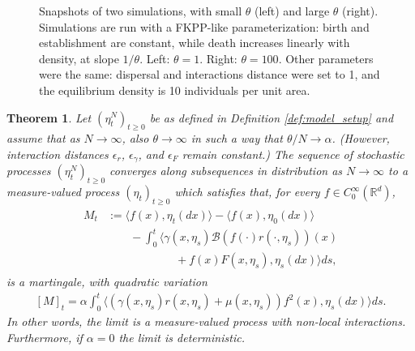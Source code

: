 \documentclass[12pt]{article}
\newtheorem{theorem}{Theorem}[section]
\newcommand{\IR}{\mathbb R}
\begin{document}
\begin{figure}
\begin{center}
    \end{center}
    \caption{
        Snapshots of two simulations, with small $\theta$ (left) and large $\theta$ (right).
        Simulations are run with a FKPP-like parameterization:
        birth and establishment are constant, while death increases linearly with density,
        at slope $1/\theta$.
        Left: $\theta=1$. Right: $\theta=100$.
        Other parameters were the same:
        dispersal and interactions distance were set to 1,
        and the equilibrium density is 10 individuals per unit area.
        \label{fig:super_vs_det_2d}
    }
\end{figure}

\begin{theorem} \label{thm:nonlocal_convergence}
    Let $(\eta^N_t)_{t \geq 0}$
    be as defined in Definition \ref{def:model_setup}
    and assume that as $N \to \infty$, also $\theta \to \infty$
    in such a way that $\theta/N \to \alpha$.
    (However, interaction distances $\epsilon_r$, $\epsilon_\gamma$, and $\epsilon_F$
    remain constant.)
    The sequence of stochastic processes
    $(\eta^N_t)_{t \geq 0}$
    converges along subsequences in distribution as $N \to \infty$
    to a measure-valued process $(\eta_t)_{t \geq 0}$
    which satisfies that, for every $f \in C^\infty_0(\IR^d)$,
    \begin{align} \label{eqn:limiting_mgale_problem}
        \begin{split}
        M_t
            &:=
            \langle f(x), \eta_t(dx) \rangle
            -
            \langle f(x), \eta_0(dx) \rangle
            \\ & \qquad
            -
            \int_0^t \big\langle
                \gamma(x, \eta_s)
                \mathcal{B}\left(
                    f(\cdot) r(\cdot, \eta_s)
                \right)(x)
                \\ &\qquad \qquad \qquad {}
                +
                f(x)
                F(x, \eta_s),
                \eta_{s}(dx)
            \big\rangle ds,
        \end{split}
    \end{align}
    is a martingale,
    with quadratic variation
    \begin{align} \label{eqn:limiting_mgale_variation}
        [ M ]_t
        =
        \alpha
        \int_0^t
        \big\langle
            \left(\gamma\left( x, \eta_{s} \right)
            r\left(x, \eta_{s} \right) + \mu\left(x, \eta_{s} \right)\right)
            f^2(x),
            \eta_{s} (dx)
        \big\rangle ds. 
    \end{align}
    In other words, the limit is a measure-valued process with non-local interactions.
    Furthermore, if $\alpha = 0$ the limit is deterministic.
\end{theorem}
\end{document}
